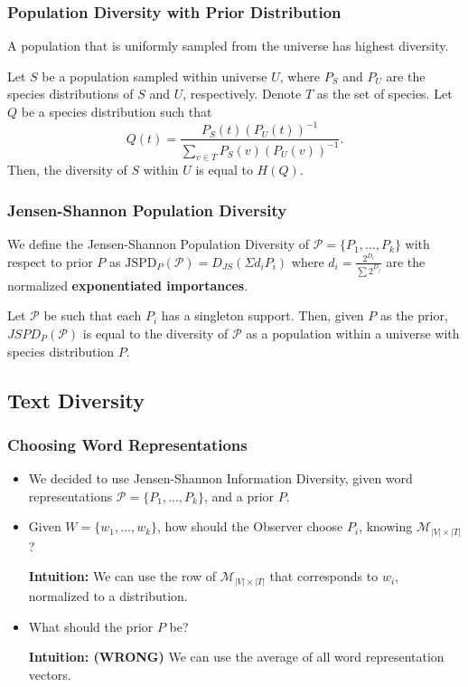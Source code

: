 \documentclass{beamer}
\newcommand\bet{\begin{Theorem}}
\newcommand\eet{\end{Theorem}}
\newcommand\bed{\begin{Definition}}
\newcommand\eed{\end{Definition}}
\newcommand\cP{{\mathcal P}}
\newcommand\cM{{\mathcal M}}
\begin{document}
\begin{frame}
\frametitle{Population Diversity with Prior Distribution}
\bet
A population that is uniformly sampled from the universe has
  highest diversity. 
\eet
\bet
Let $S$ be a population sampled within universe $U$, where $P_S$ and
$P_U$ are the species distributions of $S$ and $U$,
respectively. Denote $T$ as the set of species. Let $Q$ be a species
distribution such that
\[Q(t)=\frac{P_S(t)(P_U(t))^{-1}}{\sum_{v\in T} P_S(v)(P_U(v))^{-1}}.\]
Then, the diversity of $S$ within $U$ is equal to $H(Q)$.
\eet
\end{frame}

\begin{frame}
\frametitle{Jensen-Shannon Population Diversity}
\bed
We define the Jensen-Shannon Population Diversity of
$\cP=\{P_1,...,P_k\}$ with respect to prior $P$ as
$\mbox{JSPD}_P(\cP)=D_{JS}(\Sigma d_i P_i)$ 
where $d_{i}=\frac{2^{D_{i}}}{\sum 2^{D_{j}}}$ are the normalized
{\bf exponentiated importances}.
\eed
\bet
Let $\cP$ be such that each $P_i$ has a singleton support. Then, given
$P$ as the 
prior,  $JSPD_P(\cP)$ is equal to the diversity of $\cP$ as a
population within a universe with species distribution $P$.
\eet
\end{frame}

\subsection{Text Diversity}

\begin{frame}
\frametitle{Choosing Word Representations}
\begin{itemize}
\item We decided to use Jensen-Shannon Information Diversity, given
  word representations $\cP=\{P_1,...,P_k\}$, and a prior $P$.
\item Given $W=\{w_1,...,w_k\}$, how should the Observer choose $P_{i}$, knowing
  $\cM_{|V|\times|T|}$?

{\bf Intuition:} We can use the row of $\cM_{|V|\times|T|}$ that
corresponds to $w_i$, normalized to a distribution.
\item What should the prior $P$ be?

{\bf Intuition: (WRONG)} We can use the average of all word representation vectors.
\end{itemize}
\end{frame}
\end{document}
